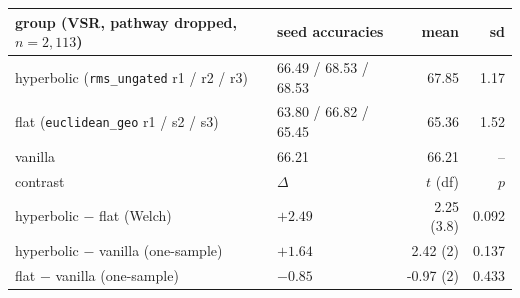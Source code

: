 \begin{tabular}{@{}l l r r@{}}
\toprule
group (VSR, pathway dropped, $n{=}2{,}113$) & seed accuracies & mean & sd \\
\midrule
hyperbolic (\texttt{rms\_ungated} r1 / r2 / r3) & 66.49 / 68.53 / 68.53 & 67.85 & 1.17 \\
flat (\texttt{euclidean\_geo} r1 / s2 / s3) & 63.80 / 66.82 / 65.45 & 65.36 & 1.52 \\
vanilla & 66.21 & 66.21 & -- \\
\midrule
contrast & $\Delta$ & $t$ (df) & $p$ \\
\midrule
hyperbolic $-$ flat (Welch) & $+2.49$ & 2.25 (3.8) & 0.092 \\
hyperbolic $-$ vanilla (one-sample) & $+1.64$ & 2.42 (2) & 0.137 \\
flat $-$ vanilla (one-sample) & $-0.85$ & -0.97 (2) & 0.433 \\
\bottomrule
\end{tabular}
